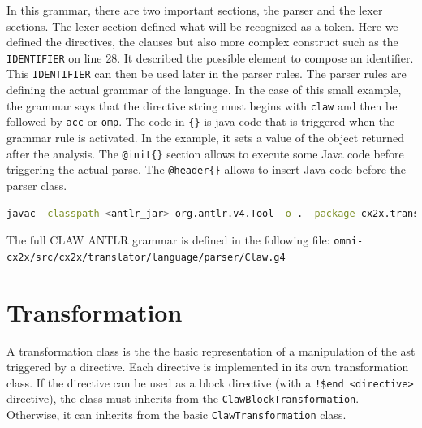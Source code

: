 \documentclass[a4paper, 11pt]{report}
\begin{document}
In this grammar, there are two important sections, the parser and the lexer
sections. The lexer section defined what will be recognized as a token. Here
we defined the directives, the clauses but also more complex construct such as
the \lstinline|IDENTIFIER| on line 28. It described the possible element to
compose an identifier. This \lstinline|IDENTIFIER| can then be used later in
the parser rules.
The parser rules are defining the actual grammar of the language. In the case
of this small example, the grammar says that the directive string must begins
with \lstinline|claw| and then be followed by \lstinline|acc| or
\lstinline|omp|. The code in \lstinline|{}| is java code that is triggered
when the grammar rule is activated. In the example, it sets a value of the
object returned after the analysis.
The \lstinline|@init{}| section allows to execute some Java code before
triggering the actual parse. The \lstinline|@header{}| allows to insert Java
code before the parser class.

\begin{lstlisting}[label=lst:antlr_cmd, caption=ANTLR parser generation command, language=bash]
javac -classpath <antlr_jar> org.antlr.v4.Tool -o . -package cx2x.translator.language.parser Claw.g4
\end{lstlisting}

The full CLAW ANTLR grammar is defined in the following file:
\lstinline|omni-cx2x/src/cx2x/translator/language/parser/Claw.g4|

\chapter{Transformation}
\label{chapter:transformation}
A transformation class is the the basic representation of a manipulation of the
\gls{ast} triggered by a directive. Each directive is implemented in its own
transformation class. If the directive can be used as a block directive (with a
\lstinline|!$end <directive>| directive), the class must inherits from the
\lstinline!ClawBlockTransformation!. Otherwise, it can inherits from the basic
\lstinline!ClawTransformation! class.
\end{document}
